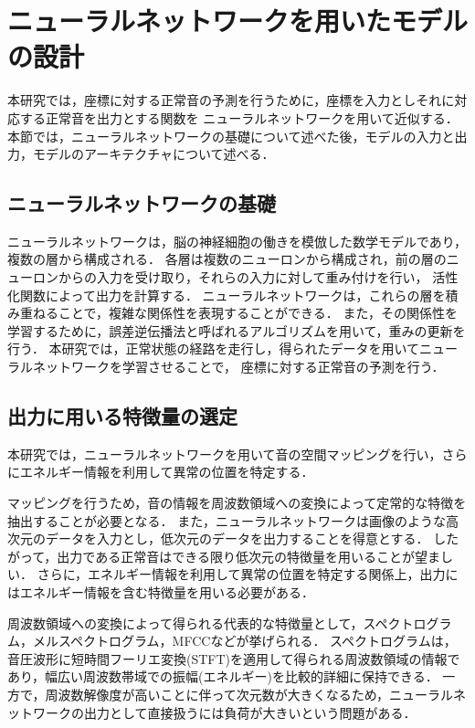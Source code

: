 \documentclass[../main]{subfiles}
\begin{document}
\section{ニューラルネットワークを用いたモデルの設計}
\label{sec:pmethod_neural_network}

本研究では，座標に対する正常音の予測を行うために，座標を入力としそれに対応する正常音を出力とする関数を
ニューラルネットワークを用いて近似する．
本節では，ニューラルネットワークの基礎について述べた後，モデルの入力と出力，モデルのアーキテクチャについて述べる．
\subsection{ニューラルネットワークの基礎}
ニューラルネットワークは，脳の神経細胞の働きを模倣した数学モデルであり，複数の層から構成される．
各層は複数のニューロンから構成され，前の層のニューロンからの入力を受け取り，それらの入力に対して重み付けを行い，
活性化関数によって出力を計算する．
ニューラルネットワークは，これらの層を積み重ねることで，複雑な関係性を表現することができる．
また，その関係性を学習するために，誤差逆伝播法と呼ばれるアルゴリズムを用いて，重みの更新を行う．
本研究では，正常状態の経路を走行し，得られたデータを用いてニューラルネットワークを学習させることで，
座標に対する正常音の予測を行う．

\subsection{出力に用いる特徴量の選定}
\label{sec:pmethod_feature_selection}

本研究では，ニューラルネットワークを用いて音の空間マッピングを行い，さらにエネルギー情報を利用して異常の位置を特定する．

マッピングを行うため，音の情報を周波数領域への変換によって定常的な特徴を抽出することが必要となる． また，ニューラルネットワークは画像のような高次元のデータを入力とし，低次元のデータを出力することを得意とする． したがって，出力である正常音はできる限り低次元の特徴量を用いることが望ましい． さらに，エネルギー情報を利用して異常の位置を特定する関係上，出力にはエネルギー情報を含む特徴量を用いる必要がある．

周波数領域への変換によって得られる代表的な特徴量として，スペクトログラム，メルスペクトログラム，MFCCなどが挙げられる． スペクトログラムは，音圧波形に短時間フーリエ変換(STFT)を適用して得られる周波数領域の情報であり，幅広い周波数帯域での振幅(エネルギー)を比較的詳細に保持できる． 一方で，周波数解像度が高いことに伴って次元数が大きくなるため，ニューラルネットワークの出力として直接扱うには負荷が大きいという問題がある．
\end{document}
